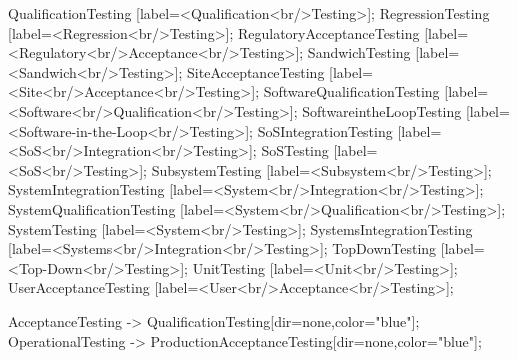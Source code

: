 \documentclass{article}
\begin{document}
{QualificationTesting [label=<Qualification<br/>Testing>];
RegressionTesting [label=<Regression<br/>Testing>];
RegulatoryAcceptanceTesting [label=<Regulatory<br/>Acceptance<br/>Testing>];
SandwichTesting [label=<Sandwich<br/>Testing>];
SiteAcceptanceTesting [label=<Site<br/>Acceptance<br/>Testing>];
SoftwareQualificationTesting [label=<Software<br/>Qualification<br/>Testing>];
SoftwareintheLoopTesting [label=<Software-in-the-Loop<br/>Testing>];
SoSIntegrationTesting [label=<SoS<br/>Integration<br/>Testing>];
SoSTesting [label=<SoS<br/>Testing>];
SubsystemTesting [label=<Subsystem<br/>Testing>];
SystemIntegrationTesting [label=<System<br/>Integration<br/>Testing>];
SystemQualificationTesting [label=<System<br/>Qualification<br/>Testing>];
SystemTesting [label=<System<br/>Testing>];
SystemsIntegrationTesting [label=<Systems<br/>Integration<br/>Testing>];
TopDownTesting [label=<Top-Down<br/>Testing>];
UnitTesting [label=<Unit<br/>Testing>];
UserAcceptanceTesting [label=<User<br/>Acceptance<br/>Testing>];

AcceptanceTesting -> QualificationTesting[dir=none,color="blue"];
OperationalTesting -> ProductionAcceptanceTesting[dir=none,color="blue"];

}
\end{document}
